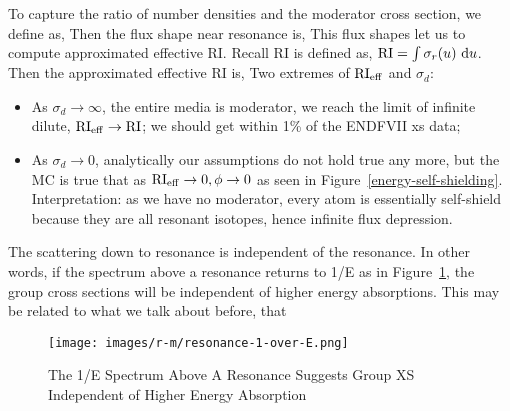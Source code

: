 \documentclass{school-22.211-notes}
\begin{document}
To capture the ratio of number densities and the moderator cross section, we define  as,
Then the flux shape near resonance is,
This flux shapes let us to compute approximated effective RI. Recall RI is defined as, $\mathrm{RI} = \int \sigma_r (u) \mbox{ }\mathrm{d} u$. Then the approximated effective RI is,
Two extremes of $\mathrm{RI}_{\mathrm{eff}}$ and $\sigma_d$:
\begin{itemize}
\item As $\sigma_d \to \infty$, the entire media is moderator, we reach the limit of infinite dilute, $\mathrm{RI}_{\mathrm{eff}} \to \mathrm{RI}$; we should get within 1\% of the ENDFVII xs data;
\item As $\sigma_d \to 0$, analytically our assumptions do not hold true any more, but the MC is true that as $\mathrm{RI}_{\mathrm{eff}} \to 0, \phi \to 0$ as seen in Figure~\ref{energy-self-shielding}. Interpretation: as we have no moderator, every atom is essentially self-shield because they are all resonant isotopes, hence infinite flux depression.  
\end{itemize}
The scattering down to resonance is independent of the resonance. In other words, if the spectrum above a resonance returns to 1/E as in Figure~\ref{1overE}, the group cross sections will be independent of higher energy absorptions. This may be related to what we talk about before, that 
\begin{figure}
  \centering
  \texttt{[image: images/r-m/resonance-1-over-E.png]}
  \caption{The 1/E Spectrum Above A Resonance Suggests Group XS Independent of Higher Energy Absorption} \label{1overE}
\end{figure}
\end{document}
